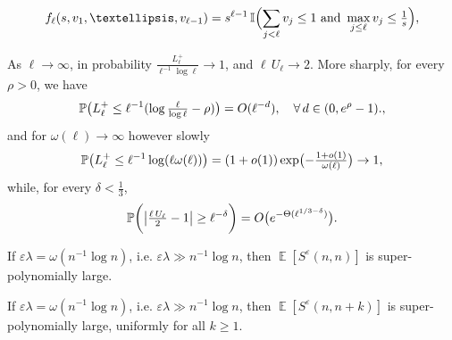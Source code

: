 \documentclass[10pt,a4paper]{amsart}
\newcommand{\E}{\operatorname{\mathbb{E}}}
\def\eps{\varepsilon}
\begin{document}
\begin{equation}\label{A}
 f_{\ell}(s,v_1,\dots,v_{\ell-1})=s^{\ell-1}\,\Bbb I\Bigl(\sum_{j<\ell}v_j\le 1\text{ and } \max_{j\le \ell}v_j\le\tfrac{1}{s}\Bigr),
\end{equation}

\begin{lemma}\label{lem0} As $\ell\to\infty$, in probability $\tfrac{L_{\ell}^+}{\ell^{-1}\log \ell}\to 1$, and $\ell\, U_{\ell}\to 2$. More sharply, for every $\rho>0$, we have 
\[
\Bbb P\bigl(L_{\ell}^+\le \ell^{-1}(\log\tfrac{\ell}{\log \ell}-\rho)\bigr)=O(\ell^{-d}), \quad
\forall\,d\in (0,e^{\rho}-1).,
\]
and for $\omega(\ell)\to\infty$ however slowly 
\[
\Bbb P\bigl(L_{\ell}^+\le \ell^{-1}\log(\ell\omega(\ell))\bigr)=(1+o(1))\exp\bigl(-\tfrac{1+o(1)}{\omega(\ell)}\bigr)\to 1, 
\]
while, for every $\delta<\tfrac{1}{3}$,
\[
\Bbb P\biggl(\big|\tfrac{\ell\, U_{\ell}}{2}-1\big|\ge \ell^{-\delta}\biggr)=O\bigl(e^{-\Theta(\ell^{1/3-\delta})}\bigr).
\]
\end{lemma}

\begin{lemma}\label{lem2} If $\eps \lambda =\omega(n^{-1}\log n)$, i.e. $\eps \lambda\gg n^{-1}\log n$, then $\E[S^{\eps}(n,n)]$ is super-polynomially large.
\end{lemma}

\begin{lemma}\label{lem4} If $\eps \lambda =\omega(n^{-1}\log n)$, i.e. $\eps \lambda\gg n^{-1}\log n$, then $\E[S^{\eps}(n,n+k)]$ is super-polynomially large, uniformly for all $k\ge 1$. %
\end{lemma}
\end{document}
